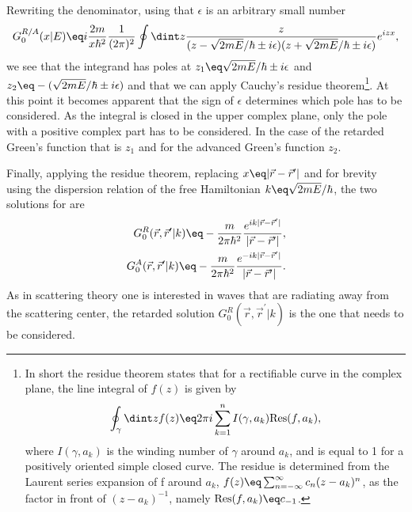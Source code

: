 \documentclass[\main/dresen_thesis.tex]{subfiles}
\begin{document}
    Rewriting the denominator, using that $\epsilon$ is an arbitrary small number
    \begin{align}
      G_0^{R/A}(x | E) \eq i \frac{2m}{x\hbar^2} \frac{1}{(2\pi)^2} \oint \dint z \frac{z}{(z - \sqrt{2mE}/\hbar \pm i \epsilon)(z + \sqrt{2mE}/\hbar \pm i \epsilon)} e^{i z x},
    \end{align}
    we see that the integrand has poles at $z_1 \eq \sqrt{2mE}/\hbar \pm i \epsilon$ and $z_2 \eq -(\sqrt{2mE}/\hbar \pm i \epsilon)$ and that we can apply Cauchy's residue theorem\footnote{
      In short the residue theorem states that for a rectifiable curve in the complex plane, the line integral of $f(z)$ is given by
      \begin{align}
        \oint_\gamma \dint z f(z) \eq 2 \pi i \sum_{k=1}^n I(\gamma, a_k) \mathrm{Res}(f, a_k)\nonumber,
      \end{align}
      where $I(\gamma, a_k)$ is the winding number of $\gamma$ around $a_k$, and is equal to 1 for a positively oriented simple closed curve. The residue is determined from the Laurent series expansion of f around $a_k$, $f(z) \eq \sum_{n=-\infty}^\infty c_n (z-a_k)^n$, as the factor in front of $(z - a_k)^{-1}$, namely $\mathrm{Res}(f, a_k) \eq c_{-1}$.
    }.
    At this point it becomes apparent that the sign of $\epsilon$ determines which pole has to be considered.
    As the integral is closed in the upper complex plane, only the pole with a positive complex part has to be considered.
    In the case of the retarded Green's function that is $z_1$ and for the advanced Green's function $z_2$.

    Finally, applying the residue theorem, replacing $x \eq |\vec{r} - \vec{r}^\prime|$ and for brevity using the dispersion relation of the free Hamiltonian $k \eq \sqrt{2mE}/\hbar$, the two solutions for  are
    \begin{align}
      G_0^R(\vec{r},  \vec{r}^\prime | k) \eq - \frac{m}{ 2\pi\hbar^2}  \frac {e^{i k |\vec{r} - \vec{r}^\prime|}}{|\vec{r} - \vec{r}^\prime|},\\
      G_0^A(\vec{r},  \vec{r}^\prime | k) \eq - \frac{m}{ 2\pi\hbar^2}  \frac {e^{-i k |\vec{r} - \vec{r}^\prime|}}{|\vec{r} - \vec{r}^\prime|}.
    \end{align}
    As in scattering theory one is interested in waves that are radiating away from the scattering center, the retarded solution $G_0^R(\vec{r},  \vec{r}^\prime | k)$ is the one that needs to be considered.
\end{document}
